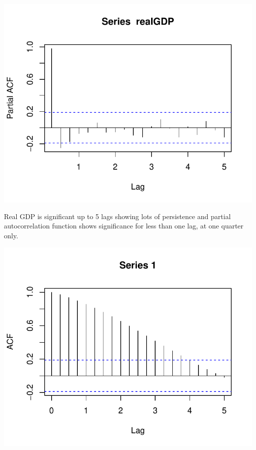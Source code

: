 \documentclass[11pt,preprint, authoryear]{elsarticle}
\numberwithin{equation}{section}
\numberwithin{figure}{section}
\numberwithin{table}{section}
\begin{document}
\begin{center}\includegraphics{README_files/figure-latex/unnamed-chunk-31-2} \end{center}

Real GDP is significant up to 5 lags showing lots of persistence and
partial autocorrelation function shows significance for less than one
lag, at one quarter only.

\begin{center}\includegraphics{README_files/figure-latex/unnamed-chunk-32-1} \end{center}
\end{document}
